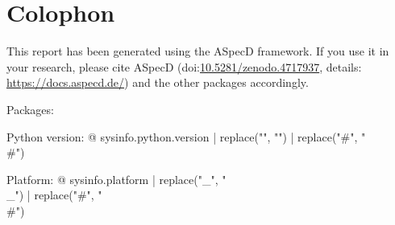 \section*{Colophon}

This report has been generated using the ASpecD framework. If you use it in your research, please cite ASpecD (doi:\href{https://doi.org/10.5281/zenodo.4717937}{10.5281/zenodo.4717937}, details: \url{https://docs.aspecd.de/}) and the other packages accordingly.

Packages: %


Python version: {@ sysinfo.python.version | replace("\n", "") | replace("#", "\\#") }

Platform: {@ sysinfo.platform | replace("_", "\\_") | replace("#", "\\#") }
